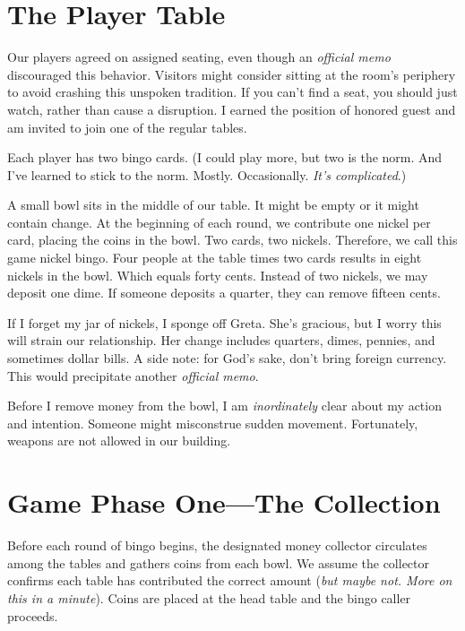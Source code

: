 \documentclass[
  letterpaper,
  DIV=11,
  numbers=noendperiod]{scrreprt}
\begin{document}
\section*{The Player Table}\label{the-player-table}


Our players agreed on assigned seating, even though an \emph{official
memo} discouraged this behavior. Visitors might consider sitting at the
room's periphery to avoid crashing this unspoken tradition. If you can't
find a seat, you should just watch, rather than cause a disruption. I
earned the position of honored guest and am invited to join one of the
regular tables.

Each player has two bingo cards. (I could play more, but two is the
norm. And I've learned to stick to the norm. Mostly. Occasionally.
\emph{It's complicated}.)

A small bowl sits in the middle of our table. It might be empty or it
might contain change. At the beginning of each round, we contribute one
nickel per card, placing the coins in the bowl. Two cards, two nickels.
Therefore, we call this game nickel bingo. Four people at the table
times two cards results in eight nickels in the bowl. Which equals forty
cents. Instead of two nickels, we may deposit one dime. If someone
deposits a quarter, they can remove fifteen cents.

If I forget my jar of nickels, I sponge off Greta. She's gracious, but I
worry this will strain our relationship. Her change includes quarters,
dimes, pennies, and sometimes dollar bills. A side note: for God's sake,
don't bring foreign currency. This would precipitate another
\emph{official memo}.

Before I remove money from the bowl, I am \emph{inordinately} clear
about my action and intention. Someone might misconstrue sudden
movement. Fortunately, weapons are not allowed in our building.

\section*{Game Phase One---The
Collection}\label{game-phase-onethe-collection}


Before each round of bingo begins, the designated money collector
circulates among the tables and gathers coins from each bowl. We assume
the collector confirms each table has contributed the correct amount
(\emph{but maybe not. More on this in a minute}). Coins are placed at
the head table and the bingo caller proceeds.
\end{document}
